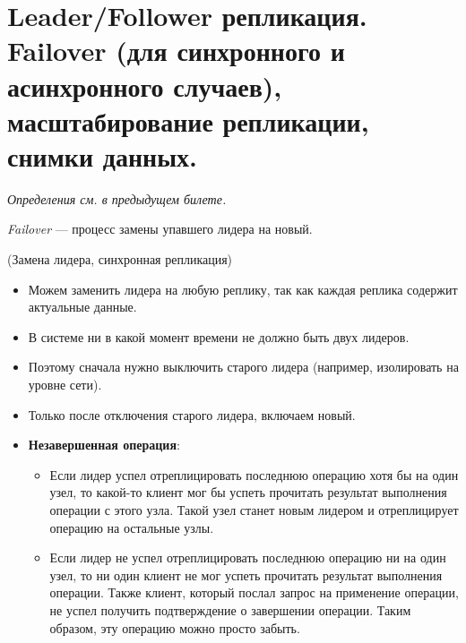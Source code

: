 \section{Leader/Follower репликация. Failover (для синхронного и асинхронного случаев), масштабирование репликации, снимки данных.}

\textit{Определения см. в предыдущем билете.}

\begin{definition}
    \textit{Failover} --- процесс замены упавшего лидера на новый.
\end{definition}

\begin{algorithm}(Замена лидера, синхронная репликация)
    \begin{itemize}
        \item Можем заменить лидера на любую реплику, так как каждая реплика содержит актуальные данные.
        \item В системе ни в какой момент времени не должно быть двух лидеров.
        \item Поэтому сначала нужно выключить старого лидера (например, изолировать на уровне сети).
        \item Только после отключения старого лидера, включаем новый.

        \item \textbf{Незавершенная операция}:
        \begin{itemize}
            \item Если лидер успел отреплицировать последнюю операцию хотя бы на один узел, то какой-то клиент мог бы успеть прочитать результат выполнения операции с этого узла. Такой узел станет новым лидером и отреплицирует операцию на остальные узлы.
            \item Если лидер не успел отреплицировать последнюю операцию ни на один узел, то ни один клиент не мог успеть прочитать результат выполнения операции. Также клиент, который послал запрос на применение операции, не успел получить подтверждение о завершении операции. Таким образом, эту операцию можно просто забыть.
        \end{itemize}

    \end{itemize}

\end{algorithm}


